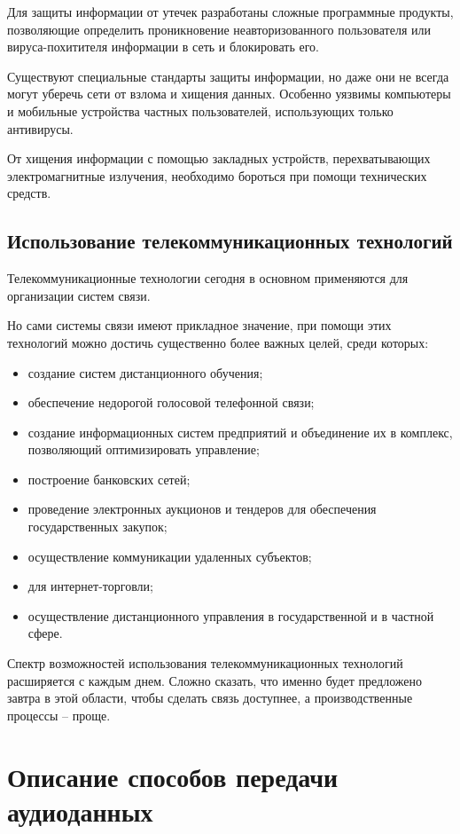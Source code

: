 \documentclass[a4paper]{report}
\begin{document}
Для защиты информации от утечек разработаны сложные программные продукты, позволяющие определить проникновение неавторизованного пользователя или вируса-похитителя информации в сеть и блокировать его.

Существуют специальные стандарты защиты информации, но даже они не всегда могут уберечь сети от взлома и хищения данных. Особенно уязвимы компьютеры и мобильные устройства частных пользователей, использующих только антивирусы.

От хищения информации с помощью закладных устройств, перехватывающих электромагнитные излучения, необходимо бороться при помощи технических средств.

\subsection{Использование телекоммуникационных технологий}
Телекоммуникационные технологии сегодня в основном применяются для организации систем связи.

Но сами системы связи имеют прикладное значение, при помощи этих технологий можно достичь существенно более важных целей, среди которых:
\begin{itemize}
\item создание систем дистанционного обучения;
\item обеспечение недорогой голосовой телефонной связи;
\item создание информационных систем предприятий и объединение их в комплекс, позволяющий оптимизировать управление;
\item построение банковских сетей;
\item проведение электронных аукционов и тендеров для обеспечения государственных закупок;
\item осуществление коммуникации удаленных субъектов;
\item для интернет-торговли;
\item осуществление дистанционного управления в государственной и в частной сфере.
\end{itemize}

Спектр возможностей использования телекоммуникационных технологий расширяется с каждым днем. Сложно сказать, что именно будет предложено завтра в этой области, чтобы сделать связь доступнее, а производственные процессы – проще.

\section{Описание способов передачи аудиоданных}
\end{document}
